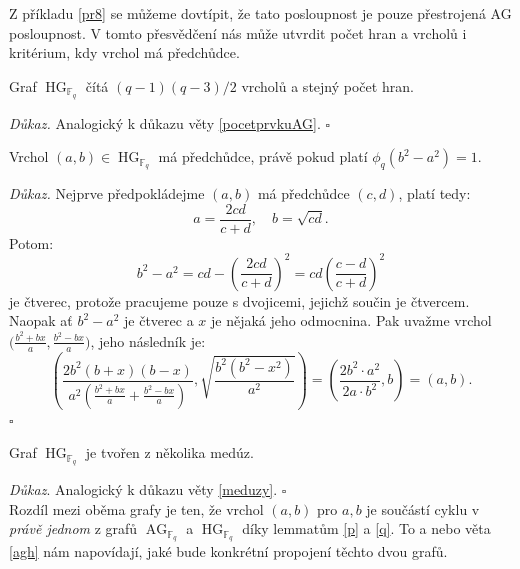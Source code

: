 \documentclass[12pt]{report}
\DeclareMathOperator{\AG}{AG}
\DeclareMathOperator{\HG}{HG}
\begin{document}
Z příkladu \ref{pr8} se můžeme dovtípit, že tato posloupnost je pouze přestrojená AG posloupnost. V tomto přesvědčení nás může utvrdit počet hran a vrcholů i kritérium, kdy vrchol má předchůdce.

\begin{veta}
Graf $\HG_{\mathbb{F}_q}$ čítá $(q-1)(q-3)/2$ vrcholů a stejný počet hran.
\end{veta}
\textit{Důkaz.} Analogický k důkazu věty \ref{pocetprvkuAG}. \hfill $\square$


\begin{lemma}\label{q}
Vrchol $(a,b) \in \HG_{\mathbb{F}_q}$ má předchůdce, právě pokud platí $\phi_q(b^2-a^2)=1$.
\end{lemma}

\noindent \textit{Důkaz.} Nejprve předpokládejme $(a,b)$ má předchůdce $(c,d)$, platí tedy:
\begin{equation*}
a = \frac{2cd}{c+d}, \quad b = \sqrt{cd}.
\end{equation*}
Potom:
\begin{equation*}
b^2-a^2 = cd- \left(\frac{2 cd}{c+d} \right)^2 = cd \left( \frac{c-d}{c+d} \right)^2
\end{equation*}
je čtverec, protože pracujeme pouze s dvojicemi, jejichž součin je čtvercem. Naopak ať $b^2-a^2$ je čtverec a $x$ je nějaká jeho odmocnina. Pak uvažme vrchol $\Big(\frac{b^2+b  x}{a},\frac{b^2-bx}{a} \Big)$, jeho následník je: $$\left(\frac{2 b^2 (b+x)(b-x)}{a^2 \left(\frac{b^2+bx}{a} + \frac{b^2-bx}{a} \right)}, \sqrt{\frac{b^2(b^2-x^2)}{a^2}} \right)= \left(\frac{2 b^2 \cdot a^2}{2 a \cdot b^2 }, b \right) = \left(a, b \right).$$
 \hfill $\square$


\begin{dusledek}
Graf $\HG_{\mathbb{F}_q}$ je tvořen z několika medúz.
\end{dusledek}
\noindent \textit{Důkaz}. Analogický k důkazu věty \ref{meduzy}. \hfill $\square$\\

Rozdíl mezi oběma grafy je ten, že vrchol $(a,b)$ pro $a,b$ je součástí cyklu v \textit{právě jednom} z grafů $\AG_{\mathbb{F}_q}$ a $\HG_{\mathbb{F}_q}$ díky lemmatům \ref{p} a \ref{q}. To a nebo věta \ref{agh} nám napovídají, jaké bude konkrétní propojení těchto dvou grafů.
\end{document}
